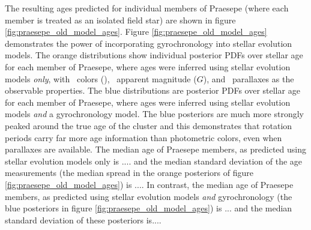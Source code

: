 
The resulting ages predicted for individual members of Praesepe (where each
member is treated as an isolated field star) are shown in figure
\ref{fig:praesepe_old_model_ages}.
Figure \ref{fig:praesepe_old_model_ages} demonstrates the power of
incorporating gyrochronology into stellar evolution models.
The orange distributions show individual posterior PDFs over stellar age for
each member of Praesepe, where ages were inferred using stellar evolution
models {\it only}, with \gaia\ colors (\gcolor), \gaia\ apparent magnitude
($G$), and \gaia\ parallaxes as the observable properties.
The blue distributions are posterior PDFs over stellar age for each member of
Praesepe, where ages were inferred using stellar evolution models {\it and}
a gyrochronology model.
The blue posteriors are much more strongly peaked around the true age of the
cluster and this demonstrates that rotation periods carry far more age
information than photometric colors, even when parallaxes are available.
The median age of Praesepe members, as predicted using stellar evolution
models only is .... and the median standard deviation of the age measurements
(the median spread in the orange posteriors of figure
\ref{fig:praesepe_old_model_ages}) is ....
In contrast, the median age of Praesepe members, as predicted using stellar
evolution models {\it and} gyrochronology (the blue posteriors in figure
\ref{fig:praesepe_old_model_ages}) is ... and the median standard deviation of
these posteriors is....

